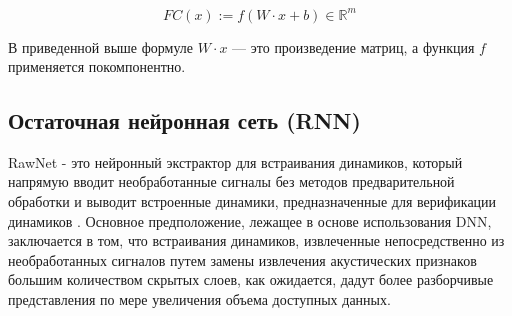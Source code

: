 \[
    FC(x) := f(W \cdot x + b) \in \mathbb{R}^{m}
\]

В приведенной выше формуле \(W \cdot x\) — это произведение матриц, а функция \(f\) применяется покомпонентно.

\subsection{Остаточная нейронная сеть (RNN)}

RawNet - это нейронный экстрактор для встраивания динамиков, который напрямую вводит необработанные сигналы без методов предварительной обработки и выводит встроенные динамики, предназначенные для верификации динамиков \cite{jung2019rawnet}. Основное предположение, лежащее в основе использования DNN, заключается в том, что встраивания динамиков, извлеченные непосредственно из необработанных сигналов путем замены извлечения акустических признаков большим количеством скрытых слоев, как ожидается, дадут более разборчивые представления по мере увеличения объема доступных данных.



